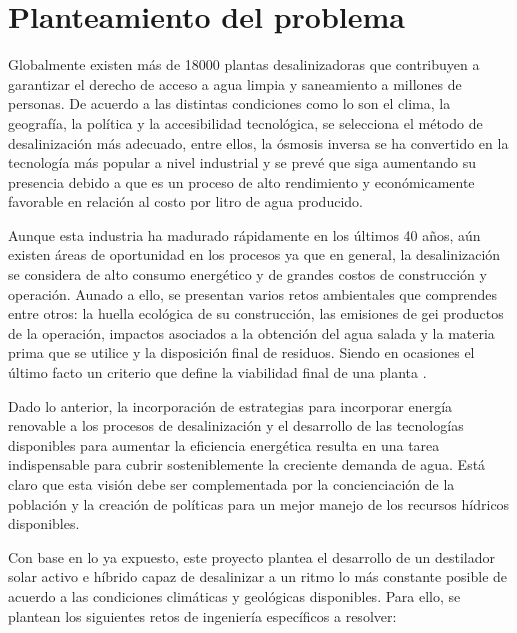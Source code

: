 \chapter{Planteamiento del problema}

	Globalmente existen más de \num{18000} plantas desalinizadoras que contribuyen a garantizar el derecho de acceso a agua limpia y saneamiento a millones de personas. De acuerdo a las distintas condiciones como lo son el clima, la geografía, la política y la accesibilidad tecnológica, se selecciona el método de desalinización más adecuado, entre ellos, la ósmosis inversa se ha convertido en la tecnología más popular a nivel industrial \cite[11]{lattemann_chapter_2010} y se prevé que siga aumentando su presencia \cite{intelligence_ro_2021} debido a que es un proceso de alto rendimiento y económicamente favorable en relación al costo por litro de agua producido.
	
	Aunque esta industria ha madurado rápidamente en los últimos 40 años, aún existen áreas de oportunidad en los procesos ya que en general, la desalinización se considera de alto consumo energético y de grandes costos de construcción y operación. Aunado a ello, se presentan varios retos ambientales que comprendes entre otros: la huella ecológica de su construcción, las emisiones de \acrshort{gei} productos de la operación, impactos asociados a la obtención del agua salada y la materia prima que se utilice y la disposición final de residuos. Siendo en ocasiones el último facto un criterio que define la viabilidad final de una planta \cite{singh_experimental_2016}.
	
	Dado lo anterior, la incorporación de estrategias para incorporar energía renovable a los procesos de desalinización y el desarrollo de las tecnologías disponibles para aumentar la eficiencia energética resulta en una tarea indispensable para cubrir sosteniblemente la creciente demanda de agua. Está claro que esta visión debe ser complementada por la concienciación de la población y la creación de políticas para un mejor manejo de los recursos hídricos disponibles.
	
	Con base en lo ya expuesto, este proyecto plantea el desarrollo de un destilador solar activo e híbrido capaz de desalinizar a un ritmo lo más constante posible de acuerdo a las condiciones climáticas y geológicas disponibles. Para ello, se plantean los siguientes retos de ingeniería específicos a resolver:
	
